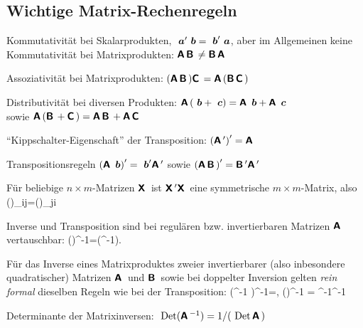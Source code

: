 \subsection{\label{sec:matrixRules}Wichtige Matrix-Rechenregeln}

\bi
\item Kommutativit\"at bei Skalarprodukten, 
${\mbox{ \boldmath{$a$}}}' {\mbox{ \boldmath{$b$}}}={\mbox{ \boldmath{$b$}}}' {\mbox{ \boldmath{$a$}}}$, aber im Allgemeinen
keine Kommutativit\"at bei Matrixprodukten: $\textbf{\textsf{A}}\,\textbf{\textsf{B}}\, \neq \textbf{\textsf{B}}\,\textbf{\textsf{A}}\,$ 

\item Assoziativit\"at bei Matrixprodukten: 
$(\textbf{\textsf{A}}\,\textbf{\textsf{B}}\,)\textbf{\textsf{C}}\,=\textbf{\textsf{A}}\,(\textbf{\textsf{B}}\,\textbf{\textsf{C}}\,)$

\item Distributivit\"at bei diversen Produkten: 
$\textbf{\textsf{A}}\,({\mbox{ \boldmath{$b$}}}+{\mbox{ \boldmath{$c$}}})=\textbf{\textsf{A}}\,{\mbox{ \boldmath{$b$}}}+\textbf{\textsf{A}}\,{\mbox{ \boldmath{$c$}}}$ \\
sowie \quad
   $\textbf{\textsf{A}}\,(\textbf{\textsf{B}}\,+\textbf{\textsf{C}}\,)=\textbf{\textsf{A}}\,\textbf{\textsf{B}}\,+\textbf{\textsf{A}}\,\textbf{\textsf{C}}\,$ 

\item ``Kippschalter-Eigenschaft'' der Transposition:
 $\left(\textbf{\textsf{A}}\,' \right)' =\textbf{\textsf{A}}\,$

\item Transpositionsregeln 
$\left(\textbf{\textsf{A}}\,{\mbox{ \boldmath{$b$}}}\right)' ={\mbox{ \boldmath{$b$}}}'  \textbf{\textsf{A}}\,' $
sowie
  $\left(\textbf{\textsf{A}}\,\textbf{\textsf{B}}\,\right)' =\textbf{\textsf{B}}\,'  \textbf{\textsf{A}}\,' $

\item F\"ur beliebige $n\times m$-Matrizen $\textbf{\textsf{X}}\,$ ist
$\textbf{\textsf{X}}\,' \textbf{\textsf{X}}\,$ eine symmetrische $m\times m$-Matrix, also
\bdm
\left(\tr {}\right)_{ij}=\left(\tr {}\right)_{ji}
\edm

\item Inverse und Transposition sind bei regul\"aren
  bzw. invertierbaren Matrizen $\textbf{\textsf{A}}\,$ vertauschbar:
\bdm
\left(\tr \right)^{-1}=\left(^{-1}\right)\tr.
\edm

\item F\"ur das Inverse eines Matrixproduktes zweier invertierbarer
  (also inbesondere quadratischer)
  Matrizen $\textbf{\textsf{A}}\,$ und $\textbf{\textsf{B}}\,$ sowie bei doppelter Inversion gelten
  \emph{rein formal} dieselben 
  Regeln wie bei der Transposition: 
\bdm
  \left(^{-1} \right)^{-1}=, \quad  
  \left(\right)^{-1} = ^{-1}^{-1}
\edm

\item Determinante der Matrixinversen:
${\mbox{ Det}}(\textbf{\textsf{A}}\,^{-1})=1/({\mbox{ Det}} \,\textbf{\textsf{A}}\,)$

